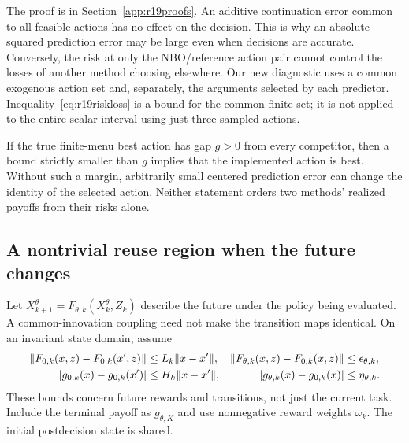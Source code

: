 The proof is in Section~\ref{app:r19proofs}. An additive continuation error
common to all feasible actions has no effect on the decision. This is why
an absolute squared prediction error may be large even when decisions are
accurate. Conversely, the risk at only the NBO/reference action pair cannot
control the losses of another method choosing elsewhere. Our new diagnostic
uses a common exogenous action set and, separately, the arguments selected
by each predictor. Inequality~\eqref{eq:r19riskloss} is a bound for the common
finite set; it is not applied to the entire scalar interval using just three
sampled actions.

If the true finite-menu best action has gap $g>0$ from every competitor,
then a bound strictly smaller than $g$ implies that the implemented action
is best. Without such a margin, arbitrarily small centered prediction error
can change the identity of the selected action. Neither statement orders two
methods' realized payoffs from their risks alone.

\subsection{A nontrivial reuse region when the future changes}
Let $X_{k+1}^\theta=F_{\theta,k}(X_k^\theta,Z_k)$ describe the future
under the policy being evaluated. A common-innovation coupling need not
make the transition maps identical. On an invariant state domain, assume
\begin{align}
 \|F_{0,k}(x,z)-F_{0,k}(x',z)\|&\leq L_k\|x-x'\|,
 &\|F_{\theta,k}(x,z)-F_{0,k}(x,z)\|&\leq\epsilon_{\theta,k},\notag\\
 |g_{0,k}(x)-g_{0,k}(x')|&\leq H_k\|x-x'\|,
 &|g_{\theta,k}(x)-g_{0,k}(x)|&\leq\eta_{\theta,k}.
 \label{eq:r19transportassumptions}
\end{align}
These bounds concern future rewards and transitions, not just the current
task. Include the terminal payoff as $g_{\theta,K}$ and use nonnegative
reward weights $\omega_k$. The initial postdecision state is shared.

